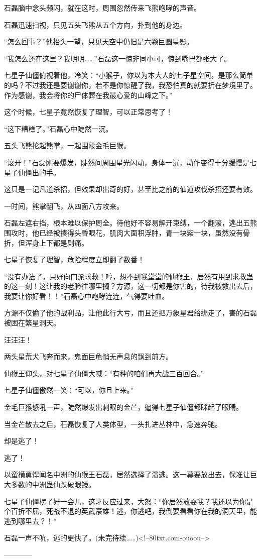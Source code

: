 \begin{this_body}
石磊脑中念头频闪，就在这时，周围忽然传来飞熊咆哮的声音。

石磊迅速扫视，只见五头飞熊从五个方向，扑到他的身边。

“怎么回事？”他抬头一望，只见天空中仍旧是六颗巨圆星影。

“我怎么还在这里？我明明……”石磊这一惊非同小可，惊到嘴巴都张大了。

七星子仙僵俯视着他，冷笑：“小猴子，你以为本大人的七子星空间，是那么简单的吗？不过我还是要谢谢你，若不是你惊醒了我，我恐怕真的就要折在梦境里了。作为感谢，我会将你的尸体葬在我最心爱的山峰之下。”

这个时候，七星子竟然恢复了理智，可以正常思考了！

“这下糟糕了。”石磊心中陡然一沉。

五头飞熊抡起熊掌，一起围殴金毛巨猴。

“滚开！”石磊刚要爆发，陡然间周围星光闪动，身体一沉，动作变得十分缓慢是七星子仙僵出的手。

这只是一记凡道杀招，但效果却出奇的好，甚至比之前的仙道攻伐杀招还要有效。

一时间，熊掌翻飞，从四面八方攻来。

石磊左遮右挡，根本难以保护周全。待他好不容易解开束缚，一个翻滚，逃出五熊围攻时，他已经被揍得头昏眼花，肌肉大面积浮肿，青一块紫一块，虽然没有骨折，但浑身上下都是剧痛。

七星子恢复了理智，危险程度立即翻了数番！

“没有办法了，只好向门派求救！哼，想不到我堂堂的仙猴王，居然有用到求救蛊的这一刻！这让我的老脸往哪里搁？方源，这一切都是你害的，待我被救出去后，我要让你好看！！”石磊心中咆哮连连，气得要吐血。

方源不仅偷了他的战利品，让他此行大亏，而且还把万象星君给绑走了，害的石磊被困在繁星洞天。

汪汪汪！

两头星荒犬飞奔而来，鬼面巨龟悄无声息的飘到前方。

仙猴王仰头，对七星子仙僵大喊：“有种的咱们再大战三百回合。”

七星子仙僵傲然一笑：“可以，你且上来。”

金毛巨猴怒吼一声，陡然爆发出刺眼的金芒，逼得七星子仙僵都眯起了眼睛。

当金芒散去之后，石磊恢复了人类体型，一头扎进丛林中，急速奔驰。

却是逃了！

逃了！

以蛮横勇悍闻名中洲的仙猴王石磊，居然选择了溃逃。这一幕要放出去，保准让巨大多数的中洲蛊仙跌破眼镜。

七星子仙僵楞了好一会儿，这才反应过来，大怒：“你居然敢耍我？我还以为你是个百折不屈，死战不退的英武豪雄！逃，你逃吧，我倒要看看你在我的洞天里，能逃到哪里去？！”

石磊一声不吭，逃的更快了。(未完待续……)<!--80txt.com-ouoou-->

------------

\end{this_body}

